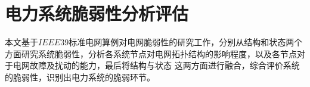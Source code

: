 





\section{电力系统脆弱性分析评估}
\label{sec:singleAssessment}

本文基于$IEEE39$标准电网算例对电网脆弱性的研究工作，分别从结构和状态两个方面研究系统脆弱性，分析各系统节点对电网拓扑结构的影响程度，以及各节点对于电网故障及扰动的能力，最后将结构与状态
这两方面进行融合，综合评价系统的脆弱性，识别出电力系统的脆弱环节。

